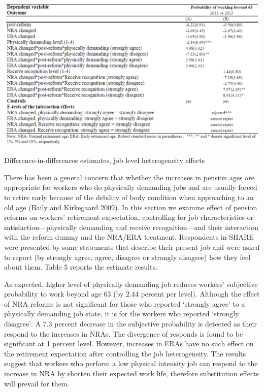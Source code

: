\documentclass[a4paper]{article}
\begin{document}
\begin{table}[h] 
    \centering
    \includegraphics[width=1\linewidth]{table5.png}
    \caption{Difference-in-differences estimates, job level heterogeneity effects}
    \label{5}
\end{table}

There has been a general concern that whether the increases in pension ages are appropriate for workers who do physically demanding jobs and are usually forced to retire early because of the debility of body condition when approaching to an old age (Baily and Kirkegaard 2009). In this section we examine effect of pension reforms on workers’ retirement expectation, controlling for job characteristics or satisfaction—physically demanding and receive recognition—and their interaction with the reform dummy and the NRA/ERA treatment. Respondents in SHARE were presented by some statements that describe their present job and were asked to report (by strongly agree, agree, disagree or strongly disagree) how they feel about them. Table 5 reports the estimate results. 

As expected, higher level of physically demanding job reduces workers’ subjective probability to work beyond age 63 (by 2.44 percent per level). Although the effect of NRA reforms is not significant for those who reported ‘strongly agree’ to a physically demanding job state, it is for the workers who reported ‘strongly disagree’: A 7.3 percent decrease in the subjective probability is detected as their respond to the increases in NRAs. The divergence of responds is found to be significant at 1 percent level. However, increases in ERAs have no such effect on the retirement expectation after controlling the job heterogeneity. The results suggest that workers who perform a low physical intensity job can respond to the increase in NRA by shorten their expected work life, therefore substitution effects will prevail for them.
\end{document}
